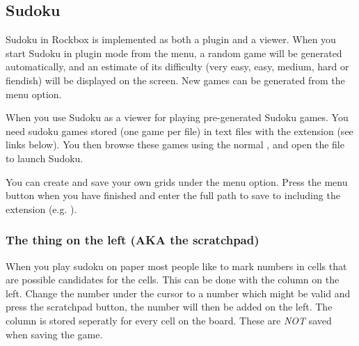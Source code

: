 \subsection{\label{ref:Sudoku}Sudoku}
Sudoku in Rockbox is implemented as both a plugin and a viewer.
When you start Sudoku in plugin mode from the  menu, a random
game will be generated automatically, and an estimate of its difficulty
(very easy, easy, medium, hard or fiendish) will be displayed on the screen.
New games can be generated from the  menu option.

When you use Sudoku as a viewer for playing pre-generated Sudoku games.
You need sudoku games stored (one game per file) in text files with the
 extension (see links below). You then browse these games using the
normal , and open the file to launch Sudoku.

You can create and save your own grids under the  menu option.
Press the menu button when you have finished and enter the full path
to save to including the  extension (e.g. ).

\subsubsection{The thing on the left (AKA the scratchpad)}
When you play sudoku on paper most people like to mark numbers in
cells that are possible candidates for the cells.
This can be done with the column on the left. Change the number
under the cursor to a number which might be valid and press the scratchpad
button, the number will then be added on the left.
The column is stored seperatly for every cell on the board.
These are \emph{NOT} saved when saving the game.

